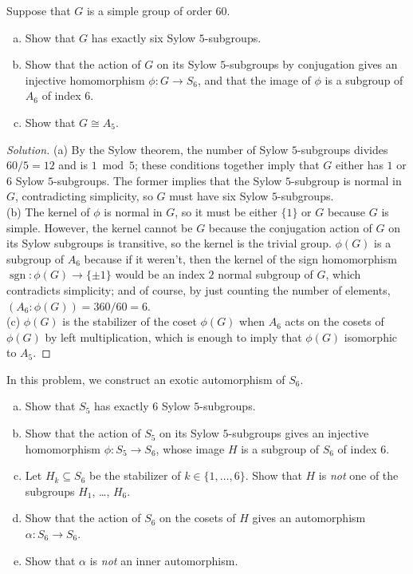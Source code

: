 \documentclass[10pt]{article}
\providecommand{\ii}{\item}
\newenvironment{soln}{\begin{proof}[Solution]}{\end{proof}}
\begin{document}
\begin{problem}
    Suppose that $G$ is a simple group of order $60$.
    \begin{enumerate}[(a)]
	\ii Show that $G$ has exactly six Sylow $5$-subgroups.
	\ii Show that the action of $G$ on its Sylow $5$-subgroups by conjugation
	gives an injective homomorphism $\phi\colon G\to S_6$,
	and that the image of $\phi$ is a subgroup of $A_6$ of index $6$.
	\ii Show that $G\cong A_5$.
    \end{enumerate}
\end{problem}

\begin{soln}
    (a) By the Sylow theorem, the number of Sylow $5$-subgroups
    divides $60/5 = 12$ and is $1\bmod 5$; these conditions together
    imply that $G$ either has $1$ or $6$ Sylow $5$-subgroups.
    The former implies that the Sylow $5$-subgroup is normal in $G$,
    contradicting simplicity, so $G$ must have six Sylow $5$-subgroups.
    \\

    (b) The kernel of $\phi$ is normal in $G$, so
    it must be either $\{1\}$ or $G$ because $G$ is simple.
    However, the kernel cannot be $G$ because
    the conjugation action of $G$ on its Sylow subgroups is transitive,
    so the kernel is the trivial group.
    $\phi(G)$ is a subgroup of $A_6$ because if it weren't, then the kernel of
    the sign homomorphism $\operatorname{sgn}:\phi(G)\to\{\pm1\}$
    would be an index $2$ normal subgroup of $G$, which contradicts simplicity;
    and of course, by just counting the number of elements, $(A_6:\phi(G)) =
    360/60 = 6$.
    \\

    (c) $\phi(G)$ is the stabilizer of the coset $\phi(G)$
    when $A_6$ acts on the cosets of $\phi(G)$ by left multiplication,
    which is enough to imply that $\phi(G)$ isomorphic to $A_5$.
\end{soln}

\begin{problem}
    In this problem, we construct an exotic automorphism of $S_6$.
    \begin{enumerate}[(a)]
        \ii Show that $S_5$ has exactly $6$ Sylow $5$-subgroups.
	\ii Show that the action of $S_5$ on its Sylow $5$-subgroups
	gives an injective homomorphism $\phi\colon S_5\to S_6$,
	whose image $H$ is a subgroup of $S_6$ of index $6$.
	\ii Let $H_k\subseteq S_6$ be the stabilizer of $k\in\{1,\dots,6\}$.
	Show that $H$ is \emph{not} one of the subgroups $H_1$, \dots, $H_6$.
	\ii Show that the action of $S_6$ on the cosets of $H$
	gives an automorphism $\alpha\colon S_6\to S_6$.
	\ii Show that $\alpha$ is \emph{not} an inner automorphism.
    \end{enumerate}
\end{problem}
\end{document}

